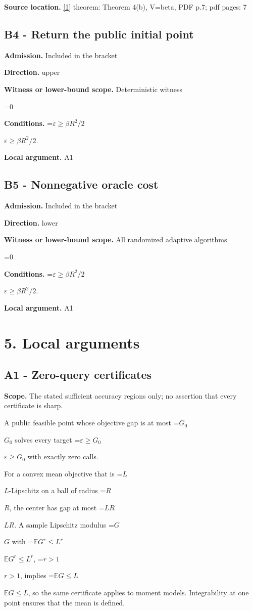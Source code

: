 \documentclass[10pt,a4paper]{article}
\newcommand{\AtlasMath}[1]{\par\begingroup\centering\setbox0=\hbox{$\displaystyle #1$}\ifdim\wd0>1.4\linewidth\typeout{ATLAS WIDE FORMULA: \the\wd0}\fi\ifdim\wd0>\linewidth\resizebox{\linewidth}{!}{\box0}\else\box0\fi\par\endgroup}
\newcommand{\AtlasInlineMath}[1]{\begingroup\setbox0=\hbox{$#1$}\ifdim\wd0>.4\linewidth\endgroup\AtlasMath{#1}\else\endgroup$#1$\fi}
\begin{document}
\textbf{Source location.} \href{https://arxiv.org/pdf/2610.05517v2}{[1]} theorem: Theorem 4(b), V=beta, PDF p.7; pdf pages: 7

\subsection{B4 - Return the public initial point}
\textbf{Admission.} Included in the bracket

\textbf{Direction.} upper

\textbf{Witness or lower-bound scope.} Deterministic witness

\AtlasMath{0}
\textbf{Conditions.} \AtlasInlineMath{\varepsilon\ge \beta R^2/2}.

\textbf{Local argument.} A1

\subsection{B5 - Nonnegative oracle cost}
\textbf{Admission.} Included in the bracket

\textbf{Direction.} lower

\textbf{Witness or lower-bound scope.} All randomized adaptive algorithms

\AtlasMath{0}
\textbf{Conditions.} \AtlasInlineMath{\varepsilon\ge \beta R^2/2}.

\textbf{Local argument.} A1

\section{5. Local arguments}
\subsection{A1 - Zero-query certificates}
\textbf{Scope.} The stated sufficient accuracy regions only; no assertion that every certificate is sharp.

A public feasible point whose objective gap is at most \AtlasInlineMath{G_0} solves every target \AtlasInlineMath{\varepsilon\ge G_0} with exactly zero calls.

For a convex mean objective that is \AtlasInlineMath{L}-Lipschitz on a ball of radius \AtlasInlineMath{R}, the center has gap at most \AtlasInlineMath{LR}. A sample Lipschitz modulus \AtlasInlineMath{G} with \AtlasInlineMath{\mathbb E G^r\le L^r}, \AtlasInlineMath{r>1}, implies \AtlasInlineMath{\mathbb E G\le L}, so the same certificate applies to moment models. Integrability at one point ensures that the mean is defined.
\end{document}
